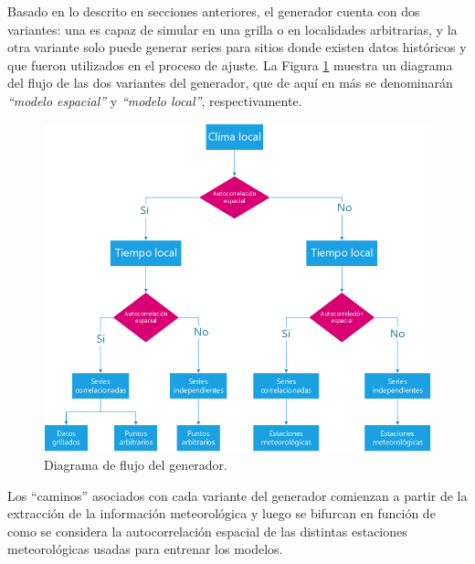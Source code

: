 \documentclass[
  12pt]{article}
\begin{document}
Basado en lo descrito en secciones anteriores, el generador cuenta con dos variantes: una es capaz de simular en una grilla o en localidades arbitrarias, y la otra variante solo puede generar series para sitios donde existen datos históricos y que fueron utilizados en el proceso de ajuste. La Figura \ref{fig:diagrama-flujo} muestra un diagrama del flujo de las dos variantes del generador, que de aquí en más se denominarán \emph{``modelo espacial''} y \emph{``modelo local''}, respectivamente.

\begin{figure}[H]

{\centering \includegraphics[width=0.75\linewidth]{./docs/figures/diagrama-flujo} 

}

\caption{Diagrama de flujo del generador.}\label{fig:diagrama-flujo}
\end{figure}

Los ``caminos'' asociados con cada variante del generador comienzan a partir de la extracción de la información meteorológica y luego se bifurcan en función de como se considera la autocorrelación espacial de las distintas estaciones meteorológicas usadas para entrenar los modelos.
\end{document}
